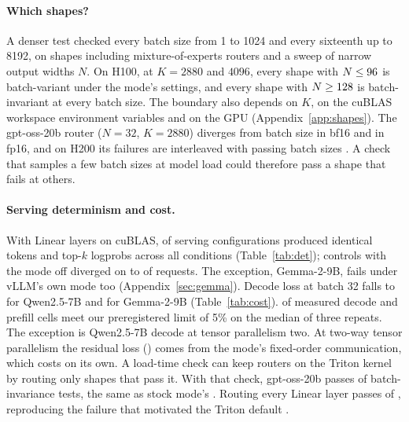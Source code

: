 \begin{table}[htbp]\centering\small
\resizebox{\linewidth}{!}{}
\caption{Rows that differ between a row multiplied alone and inside a batch, out of \PoneRowsPerMode{} per cell. BI flags: environment variables and PyTorch flags as batch-invariant mode sets them. Flags only: PyTorch flags without the cuBLAS environment variables. Defaults: PyTorch defaults (control).}\label{tab:bitwise}
\end{table}

\paragraph{Which shapes?} A denser test checked every batch size from 1 to 1024 and every sixteenth up to 8192, on \ShapeCount{} shapes including mixture-of-experts routers and a sweep of narrow output widths $N$. On H100, at $K = 2880$ and $4096$, every shape with $N \le 96{}$ is batch-variant under the mode's settings, and every shape with $N \ge 128{}$ is batch-invariant at every batch size. The boundary also depends on $K$, on the cuBLAS workspace environment variables and on the GPU (Appendix~\ref{app:shapes}). The gpt-oss-20b router ($N=32$, $K=2880$) diverges from batch size \RouterBfFirstBad{} in bf16 and \RouterFpFirstBad{} in fp16, and on H200 its failures are interleaved with passing batch sizes \citep{vllm65569}. A check that samples a few batch sizes at model load could therefore pass a shape that fails at others.

\paragraph{Serving determinism and cost.} With Linear layers on cuBLAS, \PtwoPassConfigs{} of \PtwoConfigs{} serving configurations produced identical tokens and top-$k$ logprobs across all conditions (Table~\ref{tab:det}); controls with the mode off diverged on \PtwoCtlDivMin{} to \PtwoCtlDivMax{} of requests. The exception, Gemma-2-9B, fails under vLLM's own mode too (Appendix~\ref{sec:gemma}). Decode loss at batch 32 falls to \QsevenPlain{} for Qwen2.5-7B and \GemmaPlain{} for Gemma-2-9B (Table~\ref{tab:cost}). \PtwoCostPass{} of \PtwoCostCells{} measured decode and prefill cells meet our preregistered limit of 5\% on the median of three repeats. The exception is Qwen2.5-7B decode at tensor parallelism two. At two-way tensor parallelism the residual loss (\TwoPPlain{}) comes from the mode's fixed-order communication, which costs \TwoPComm{} on its own. A load-time check can keep routers on the Triton kernel by routing only shapes that pass it. With that check, gpt-oss-20b passes \GptossVtwoPass{} of \GptossTests{} batch-invariance tests, the same as stock mode's \GptossOnPass{}. Routing every Linear layer passes \GptossBlanketPass{} of \GptossTests{}, reproducing the failure that motivated the Triton default \citep{vllm35404}.

